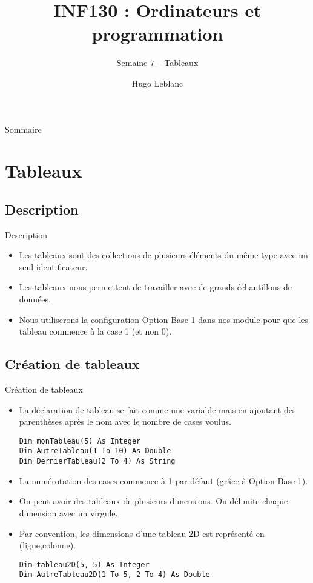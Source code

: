 \documentclass[aspectratio=169,usenames,dvipsnames]{beamer}
\title{INF130 : Ordinateurs et programmation}
\subtitle{Semaine 7 – Tableaux}
\author{Hugo Leblanc}
\begin{document}
    \maketitle

    \begin{frame}{Sommaire}
        \tableofcontents
    \end{frame}

    \section{Tableaux}
    \subsection{Description}
    \begin{frame}{Description}
        \begin{itemize}
            \item Les tableaux sont des collections de plusieurs éléments du même type avec un seul identificateur.
            \item Les tableaux nous permettent de travailler avec de grands échantillons de données.
            \item Nous utiliserons la configuration Option Base 1 dans nos module pour que les tableau commence à la case 1 (et non 0).
        \end{itemize}
    \end{frame}
    \subsection{Création de tableaux}
    \begin{frame}[fragile]{Création de tableaux}
        \begin{itemize}
            \item La déclaration de tableau se fait comme une variable mais en ajoutant des parenthèses après le nom avec le nombre de cases voulus.
\begin{lstlisting}
Dim monTableau(5) As Integer
Dim AutreTableau(1 To 10) As Double
Dim DernierTableau(2 To 4) As String
\end{lstlisting}
            \item La numérotation des cases commence à 1 par défaut (grâce à Option Base 1).
            \item On peut avoir des tableaux de plusieurs dimensions. On délimite chaque dimension avec un virgule.
            \item Par convention, les dimensions d’une tableau 2D est représenté en (ligne,colonne).
\begin{lstlisting}
Dim tableau2D(5, 5) As Integer
Dim AutreTableau2D(1 To 5, 2 To 4) As Double
\end{lstlisting}        
        \end{itemize}
    \end{frame}
\end{document}
